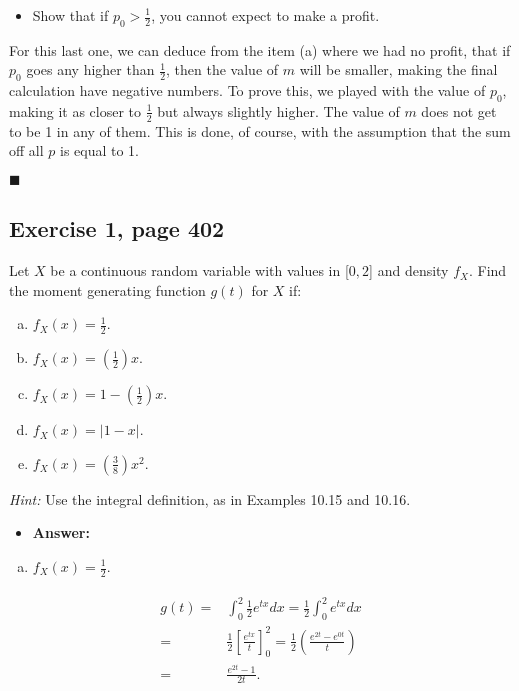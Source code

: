 \documentclass{article}
\begin{document}
\begin{itemize}
\item Show that if $p_0 > \frac{1}{2}$, you cannot expect to make a profit.
\end{itemize}
For this last one, we can deduce from the item (a) where we had no profit, that if $p_0$ goes any higher than $\frac{1}{2}$, then the value of $m$ will be smaller, making the final calculation have negative numbers. To prove this, we played with the value of $p_0$, making it as closer to $\frac{1}{2}$ but always slightly higher. The value of $m$ does not get to be 1 in any of them. This is done, of course, with the assumption that the sum off all $p$ is equal to 1.\\

\begin{flushright}
$\blacksquare$
\end{flushright}


\subsection{Exercise 1, page 402}

Let $X$ be a continuous random variable with values in [$0, 2$] and density $f_X$. Find the moment generating function $g(t)$ for $X$ if:

\begin{enumerate}[(a)]
\item $f_X (x) = \frac{1}{2}$.
\item $f_X (x) = \left(\frac{1}{2}\right)x$.
\item $f_X (x) = 1 -  \left(\frac{1}{2}\right)x$.
\item $f_X (x) = \lvert 1 - x \rvert$.
\item $f_X (x) = \left(\frac{3}{8}\right)x^2$.
\end{enumerate}
 \textit{Hint:} Use the integral definition, as in Examples 10.15 and 10.16.

\begin{itemize}
\item \textbf{Answer:}
\end{itemize}



\begin{enumerate}[(a)]
\item $f_X (x) = \frac{1}{2}$.
\end{enumerate}

\begin{eqnarray}
\label{eq3}
\begin{split}
g(t)=& \int_0^{2} \frac{1}{2}e^{tx}dx = \frac{1}{2}\int_0^2 e^{tx}dx\\
= & \frac{1}{2} \left[ \frac{e^{tx}}{t} \right]_0^2 = \frac{1}{2} \left(\frac{e^{2t} - e^{0t}}{t}\right)\\
= & \frac{e^{2t} - 1}{2t}.
\end{split}
\end{eqnarray}
\end{document}
